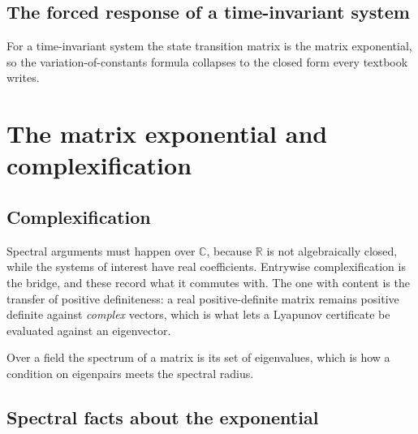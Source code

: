 






\subsection{The forced response of a time-invariant system}

For a time-invariant system the state transition matrix is the matrix exponential, so the
variation-of-constants formula collapses to the closed form every textbook writes.




\section{The matrix exponential and complexification}

\subsection{Complexification}

Spectral arguments must happen over $\mathbb{C}$, because $\mathbb{R}$ is not algebraically
closed, while the systems of interest have real coefficients. Entrywise complexification is the
bridge, and these record what it commutes with. The one with content is the transfer of positive
definiteness: a real positive-definite matrix remains positive definite against \emph{complex}
vectors, which is what lets a Lyapunov certificate be evaluated against an eigenvector.



Over a field the spectrum of a matrix is its set of eigenvalues, which is how a condition on
eigenpairs meets the spectral radius.


\subsection{Spectral facts about the exponential}

